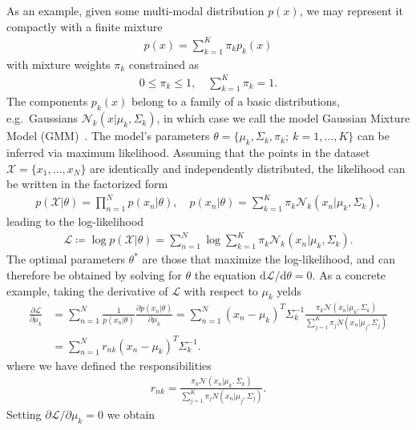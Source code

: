 As an example, given some multi-modal distribution $p(x)$, we may represent it compactly with a finite mixture
%
\begin{align}
p(x) = \sum_{k=1}^{K} \pi_{k} p_{k}(x)
\end{align}
%
with mixture weights $\pi_{k}$ constrained as
%
\begin{align}
0 \leq \pi_k \leq 1, \quad \sum_{k=1}^{K} \pi_{k} = 1.
\end{align}
%
The components $p_{k}(x)$ belong to a family of a basic distributions, e.g.\ Gaussians $\mathcal{N}_k(x | \mu_k, \Sigma_k)$, in which case we call the model Gaussian Mixture Model (GMM)~\cite{Reynolds2009}. The model's parameters $\theta = \{ \mu_k, \Sigma_k, \pi_k; ~ k = 1, \ldots, K \}$ can be inferred via maximum likelihood. Assuming that the points in the dataset $\mathcal{X} = \{x_1, \ldots , x_N \}$ are identically and independently distributed, the likelihood can be written in the factorized form
%
\begin{align}
p(\mathcal{X} | \theta ) = \prod_{n=1}^N p(x_n | \theta), \quad p(x_n | \theta) = \sum_{k=1}^K \pi_k \mathcal{N}_k(x_n | \mu_k, \Sigma_k),
\end{align}
%
leading to the log-likelihood
%
\begin{align}
\mathcal{L} \coloneqq \log p(\mathcal{X} | \theta ) = \sum_{n=1}^N \log \sum_{k=1}^K \pi_k \mathcal{N}_k(x_n | \mu_k, \Sigma_k).
\end{align}
%
The optimal parameters $\theta^{*}$ are those that maximize the log-likelihood, and can therefore be obtained by solving for $\theta$ the equation $\text{d} \mathcal{L} / \text{d}\theta = 0$.
As a concrete example, taking the derivative of $\mathcal{L}$ with respect to $\mu_{k}$ yelds
%
\begin{align}
\frac{\partial \mathcal{L}}{\partial \mu_k} &= \sum_{n=1}^{N} \frac{1}{p(x_n | \theta)} \frac{\partial p(x_n | \theta) }{\partial \mu_k} = \sum_{n=1}^{N} (x_n - \mu_k)^{T} \Sigma_k^{-1} \frac{\pi_k \mathcal{N}(x_n | \mu_k, \Sigma_k)}{\sum_{j=1}^{K} \pi_j N(x_n | \mu_j, \Sigma_j) } \\
&= \sum_{n=1}^{N} r_{nk} (x_n - \mu_k)^{T} \Sigma_k^{-1} .
\end{align}
%
where we have defined the responsibilities
%
\begin{align}
r_{nk} = \frac{\pi_k \mathcal{N}(x_n | \mu_k, \Sigma_k)}{\sum_{j=1}^{K} \pi_j N(x_n | \mu_j, \Sigma_j) }.
\end{align}
%
Setting $\partial \mathcal{L} / \partial \mu_k  = 0$ we obtain
